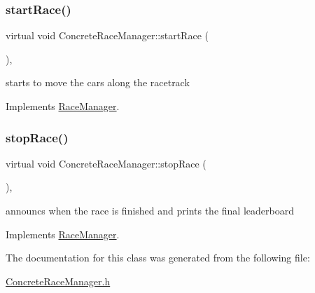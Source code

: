 \subsubsection{\texorpdfstring{start\+Race()}{startRace()}}
{\footnotesize\ttfamily virtual void Concrete\+Race\+Manager\+::start\+Race (\begin{DoxyParamCaption}{ }\end{DoxyParamCaption})\hspace{0.3cm}{\ttfamily [inline]}, {\ttfamily [virtual]}}

starts to move the cars along the racetrack 

Implements \mbox{\hyperlink{class_race_manager_a174c266d650ae1da004a6b1aada152b3}{Race\+Manager}}.

\mbox{\label{class_concrete_race_manager_ac55ae9738d8cf5ce6bd1fe2f9356c6f7}} 
\subsubsection{\texorpdfstring{stop\+Race()}{stopRace()}}
{\footnotesize\ttfamily virtual void Concrete\+Race\+Manager\+::stop\+Race (\begin{DoxyParamCaption}{ }\end{DoxyParamCaption})\hspace{0.3cm}{\ttfamily [inline]}, {\ttfamily [virtual]}}

announcs when the race is finished and prints the final leaderboard 

Implements \mbox{\hyperlink{class_race_manager_a008bf389eeb0dc37dceb5f5fd0bcf9c1}{Race\+Manager}}.



The documentation for this class was generated from the following file\+:\begin{DoxyCompactItemize}
\item 
\mbox{\hyperlink{_concrete_race_manager_8h}{Concrete\+Race\+Manager.\+h}}\end{DoxyCompactItemize}
